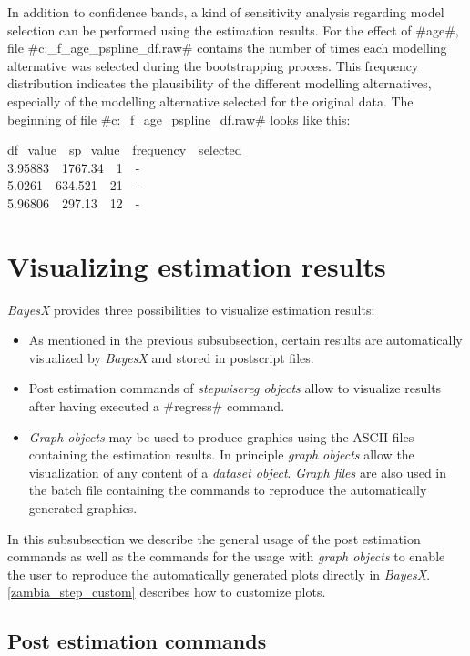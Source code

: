 \documentclass[11pt,a4paper,twoside]{bayesxreport}
\begin{document}
In addition to confidence bands, a kind of sensitivity analysis
regarding model selection can be performed using the estimation
results. For the effect of #age#, file
#c:\data\s_f_age_pspline_df.raw# contains the number of times each
modelling alternative was selected during the bootstrapping process.
This frequency distribution indicates the plausibility of the
different modelling alternatives, especially of the modelling
alternative selected for the original data. The beginning of file
#c:\data\s_f_age_pspline_df.raw# looks like this:

{\footnotesize
df\_value \,\,   sp\_value \,\, frequency \,\, selected \\
3.95883 \,\,  1767.34  \,\, 1  \,\, - \\
5.0261 \,\,  634.521 \,\,  21  \,\, - \\
5.96806 \,\,  297.13 \,\,  12 \,\,  -}


\section{Visualizing estimation results}\label{zambia_step_visual}

{\em BayesX} provides three possibilities to visualize estimation
results:
\begin{itemize}
\item As mentioned in the previous subsubsection, certain results
are automatically visualized by {\em BayesX} and stored in
postscript files. \item Post estimation commands of {\em stepwisereg
objects} allow to visualize results after having executed a
#regress# command. \item {\em Graph objects} may be used to produce
graphics using the ASCII files containing the estimation results. In
principle {\em graph objects} allow the visualization of any content
of a {\em dataset object}. {\em Graph files} are also used in the
batch file containing the commands to reproduce the automatically
generated graphics.
\end{itemize}

In this subsubsection we describe the general usage of the post
estimation commands as well as the commands for the usage with {\em
graph objects} to enable the user to reproduce the automatically
generated plots directly in {\em BayesX}.
\autoref{zambia_step_custom} describes how to customize plots.

\subsection{Post estimation commands}
\end{document}
